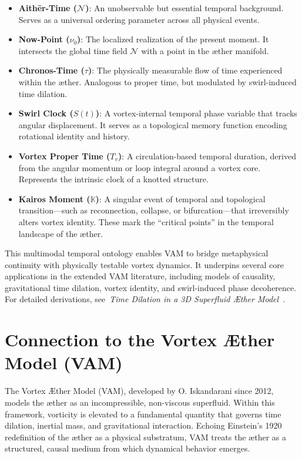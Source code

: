 \documentclass[preprint,notitlepage]{revtex4-2}
\begin{document}
\begin{itemize}
    \item \textbf{Aithēr-Time (\( \mathcal{N} \))}: An unobservable but essential temporal background. Serves as a universal ordering parameter across all physical events.

    \item \textbf{Now-Point (\( \nu_0 \))}: The localized realization of the present moment. It intersects the global time field \( \mathcal{N} \) with a point in the æther manifold.

    \item \textbf{Chronos-Time (\( \tau \))}: The physically measurable flow of time experienced within the æther. Analogous to proper time, but modulated by swirl-induced time dilation.

    \item \textbf{Swirl Clock (\( S(t) \))}: A vortex-internal temporal phase variable that tracks angular displacement. It serves as a topological memory function encoding rotational identity and history.

    \item \textbf{Vortex Proper Time (\( T_v \))}: A circulation-based temporal duration, derived from the angular momentum or loop integral around a vortex core. Represents the intrinsic clock of a knotted structure.

    \item \textbf{Kairos Moment (\( \mathbb{K} \))}: A singular event of temporal and topological transition—such as reconnection, collapse, or bifurcation—that irreversibly alters vortex identity. These mark the “critical points” in the temporal landscape of the æther.
\end{itemize}

This multimodal temporal ontology enables VAM to bridge metaphysical continuity with physically testable vortex dynamics. It underpins several core applications in the extended VAM literature, including models of causality, gravitational time dilation, vortex identity, and swirl-induced phase decoherence. For detailed derivations, see~\textit{Time Dilation in a 3D Superfluid Æther Model}~\cite{iskandarani2025vam2}.


\section{Connection to the Vortex Æther Model (VAM)}

The Vortex Æther Model (VAM), developed by O. Iskandarani since 2012, models the æther as an incompressible, non-viscous superfluid. Within this framework, vorticity is elevated to a fundamental quantity that governs time dilation, inertial mass, and gravitational interaction. Echoing Einstein’s 1920 redefinition of the æther as a physical substratum, VAM treats the æther as a structured, causal medium from which dynamical behavior emerges.
\end{document}
